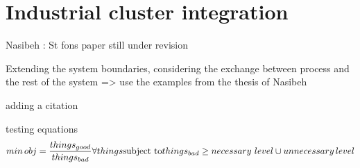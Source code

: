 \section{Industrial cluster integration}

Nasibeh : St fons paper still under revision

Extending the system boundaries, considering the exchange between process and the rest of the system => use the examples from the thesis of Nasibeh

adding a citation \cite{Pouransari_2014}

testing equations
\begin{equation}
min \, obj= \frac{things_{good}}{things_{bad}} \forall things\\
\text{subject to}  \\
things_{bad}\ge necessary\,\, level \cup unnecessary \, level
\end{equation}